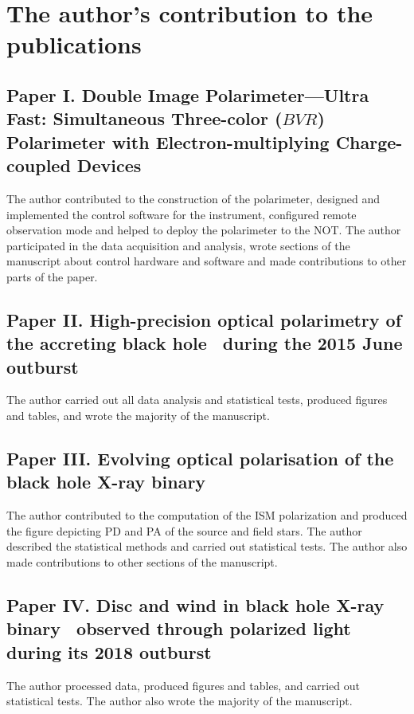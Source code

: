 \clearpage
\renewcommand{\thesection}{} 

\section{The author's contribution to the publications}

\subsection*{Paper I. Double Image Polarimeter—Ultra Fast: Simultaneous Three-color ($BVR$) Polarimeter with Electron-multiplying Charge-coupled Devices}
The author contributed to the construction of the polarimeter, designed and implemented the control software for the instrument, configured remote observation mode and helped to deploy the polarimeter to the \gls{NOT}.
The author participated in the data acquisition and analysis, wrote sections of the manuscript about control hardware and software and made contributions to other parts of the paper. 

\subsection*{Paper II. High-precision optical polarimetry of the accreting black hole \VCYG\ during the 2015 June outburst}
The author carried out all data analysis and statistical tests, produced figures and tables, and wrote the majority of the manuscript.

\subsection*{Paper III. Evolving optical polarisation of the black hole X-ray binary \MAXI}
The author contributed to the computation of the \gls{ISM} polarization and produced the figure depicting \gls{PD} and \gls{PA} of the source and field stars.
The author described the statistical methods and carried out statistical tests.
The author also made contributions to other sections of the manuscript.

\subsection*{Paper IV. Disc and wind in black hole X-ray binary \MAXI\ observed through polarized light during its 2018 outburst }
The author processed data, produced figures and tables, and carried out statistical tests. 
The author also wrote the majority of the manuscript.


